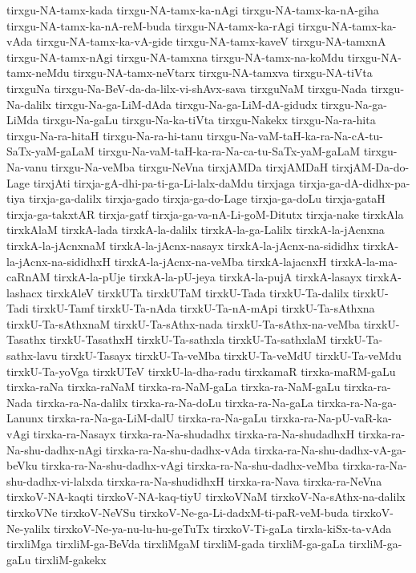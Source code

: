 {tirxgu-NA-tamx-kada
tirxgu-NA-tamx-ka-nAgi
tirxgu-NA-tamx-ka-nA-giha
tirxgu-NA-tamx-ka-nA-reM-buda
tirxgu-NA-tamx-ka-rAgi
tirxgu-NA-tamx-ka-vAda
tirxgu-NA-tamx-ka-vA-gide
tirxgu-NA-tamx-kaveV
tirxgu-NA-tamxnA
tirxgu-NA-tamx-nAgi
tirxgu-NA-tamxna
tirxgu-NA-tamx-na-koMdu
tirxgu-NA-tamx-neMdu
tirxgu-NA-tamx-neVtarx
tirxgu-NA-tamxva
tirxgu-NA-tiVta
tirxguNa
tirxgu-Na-BeV-da-da-lilx-vi-shAvx-sava
tirxguNaM
tirxgu-Nada
tirxgu-Na-dalilx
tirxgu-Na-ga-LiM-dAda
tirxgu-Na-ga-LiM-dA-gidudx
tirxgu-Na-ga-LiMda
tirxgu-Na-gaLu
tirxgu-Na-ka-tiVta
tirxgu-Nakekx
tirxgu-Na-ra-hita
tirxgu-Na-ra-hitaH
tirxgu-Na-ra-hi-tanu
tirxgu-Na-vaM-taH-ka-ra-Na-cA-tu-SaTx-yaM-gaLaM
tirxgu-Na-vaM-taH-ka-ra-Na-ca-tu-SaTx-yaM-gaLaM
tirxgu-Na-vanu
tirxgu-Na-veMba
tirxgu-NeVna
tirxjAMDa
tirxjAMDaH
tirxjAM-Da-do-Lage
tirxjAti
tirxja-gA-dhi-pa-ti-ga-Li-lalx-daMdu
tirxjaga
tirxja-ga-dA-didhx-pa-tiya
tirxja-ga-dalilx
tirxja-gado
tirxja-ga-do-Lage
tirxja-ga-doLu
tirxja-gataH
tirxja-ga-takxtAR
tirxja-gatf
tirxja-ga-va-nA-Li-goM-Ditutx
tirxja-nake
tirxkAla
tirxkAlaM
tirxkA-lada
tirxkA-la-dalilx
tirxkA-la-ga-Lalilx
tirxkA-la-jAcnxna
tirxkA-la-jAcnxnaM
tirxkA-la-jAcnx-nasayx
tirxkA-la-jAcnx-na-sididhx
tirxkA-la-jAcnx-na-sididhxH
tirxkA-la-jAcnx-na-veMba
tirxkA-lajacnxH
tirxkA-la-ma-caRnAM
tirxkA-la-pUje
tirxkA-la-pU-jeya
tirxkA-la-pujA
tirxkA-lasayx
tirxkA-lashacx
tirxkAleV
tirxkUTa
tirxkUTaM
tirxkU-Tada
tirxkU-Ta-dalilx
tirxkU-Tadi
tirxkU-Tamf
tirxkU-Ta-nAda
tirxkU-Ta-nA-mApi
tirxkU-Ta-sAthxna
tirxkU-Ta-sAthxnaM
tirxkU-Ta-sAthx-nada
tirxkU-Ta-sAthx-na-veMba
tirxkU-Tasathx
tirxkU-TasathxH
tirxkU-Ta-sathxla
tirxkU-Ta-sathxlaM
tirxkU-Ta-sathx-lavu
tirxkU-Tasayx
tirxkU-Ta-veMba
tirxkU-Ta-veMdU
tirxkU-Ta-veMdu
tirxkU-Ta-yoVga
tirxkUTeV
tirxkU-la-dha-radu
tirxkamaR
tirxka-maRM-gaLu
tirxka-raNa
tirxka-raNaM
tirxka-ra-NaM-gaLa
tirxka-ra-NaM-gaLu
tirxka-ra-Nada
tirxka-ra-Na-dalilx
tirxka-ra-Na-doLu
tirxka-ra-Na-gaLa
tirxka-ra-Na-ga-Lanunx
tirxka-ra-Na-ga-LiM-dalU
tirxka-ra-Na-gaLu
tirxka-ra-Na-pU-vaR-ka-vAgi
tirxka-ra-Nasayx
tirxka-ra-Na-shudadhx
tirxka-ra-Na-shudadhxH
tirxka-ra-Na-shu-dadhx-nAgi
tirxka-ra-Na-shu-dadhx-vAda
tirxka-ra-Na-shu-dadhx-vA-ga-beVku
tirxka-ra-Na-shu-dadhx-vAgi
tirxka-ra-Na-shu-dadhx-veMba
tirxka-ra-Na-shu-dadhx-vi-lalxda
tirxka-ra-Na-shudidhxH
tirxka-ra-Nava
tirxka-ra-NeVna
tirxkoV-NA-kaqti
tirxkoV-NA-kaq-tiyU
tirxkoVNaM
tirxkoV-Na-sAthx-na-dalilx
tirxkoVNe
tirxkoV-NeVSu
tirxkoV-Ne-ga-Li-dadxM-ti-paR-veM-buda
tirxkoV-Ne-yalilx
tirxkoV-Ne-ya-nu-lu-hu-geTuTx
tirxkoV-Ti-gaLa
tirxla-kiSx-ta-vAda
tirxliMga
tirxliM-ga-BeVda
tirxliMgaM
tirxliM-gada
tirxliM-ga-gaLa
tirxliM-ga-gaLu
tirxliM-gakekx
}
